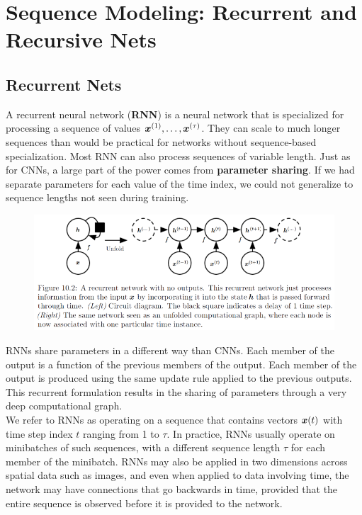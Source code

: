 \section{Sequence Modeling: Recurrent and Recursive Nets}
\begin{multicols}{2}
	\subsection{Recurrent Nets}
	A recurrent neural network (\textbf{RNN}) is a neural network that is specialized for processing a sequence of values ${\bm{x}}^{(1)},\dots,{\bm{x}}^{(\tau)}$.
	They can scale to much longer sequences than would be practical for networks without sequence-based specialization.
	Most RNN can also process sequences of variable length.
	Just as for CNNs, a large part of the power comes from \textbf{parameter sharing}.
	If we had separate parameters for each value of the time index, we could not generalize to sequence lengths not seen during training.
	\begin{figure}[H]
		\centering
		\includegraphics[width=\linewidth]{images/recurr1.png}
	\end{figure}
	
	RNNs share parameters in a different way than CNNs.
	Each member of the output is a function of the previous members of the output.
	Each member of the output is produced using the same update rule applied to the previous outputs.
	This recurrent formulation results in the sharing of parameters through a very deep computational graph.\\
	
	We refer to RNNs as operating on a sequence that contains vectors ${\bm{x}}(t)$ with time step index $t$ ranging from 1 to $\tau$. 
	In practice, RNNs usually operate on minibatches of such sequences, with a different sequence length $\tau$ for each member of the minibatch.
	RNNs may also be applied in two dimensions across spatial data such as images, and even when applied to data involving time, the network may have connections that go backwards in time, provided that the entire sequence is observed before it is provided to the network.
	

\end{multicols}
